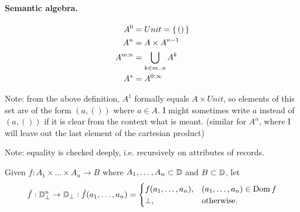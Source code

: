 \begin{defbox}
\paragraph{Semantic algebra.}
\begin{align*}
A^0 &= Unit = \left\{\,()\,\right\} \\
A^n &= A \times A^{n-1} \\
A^{m:n} &= \bigcup_{k \in m..n} A^k \\
A^{*} &= A^{0:\infty}
\end{align*}

Note: from the above definition, $A^1$ formally equals $A \times Unit$, so elements of this set are of the form $(a, ())$ where $a \in A$. I might sometimes write $a$ instead of $(a, ())$ if it is clear from the context what is meant. (similar for $A^n$, where I will leave out the last element of the cartesian product)



Note: equality is checked deeply, i.e. recursively on attributes of records.


Given $f : A_1 \times \dots \times A_n \to B$ where $A_1, \dots, A_n \subset \mathbb{D}$ and $B \subset \mathbb{D}$, let
\begin{equation*}
\hat{f} : \mathbb{D}_\bot^n \to \mathbb{D}_\bot : \hat{f}(a_1, \dots, a_n) =
\begin{cases}
f(a_1, \dots, a_n), & (a_1, \dots, a_n) \in \operatorname{Dom}{f} \\
\bot, & \text{otherwise.}
\end{cases}
\end{equation*}
\end{defbox}

